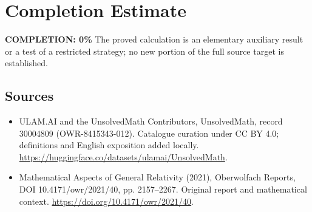 \documentclass[11pt]{article}
\begin{document}
\section{Completion Estimate}
\noindent\textbf{COMPLETION: 0\%}
The proved calculation is an elementary auxiliary result or a test of a restricted strategy; no new portion of the full source target is established.

\subsection{Sources}
\begin{itemize}
\item[\hypertarget{source:30004809:1}{S1}] ULAM.AI and the UnsolvedMath Contributors, UnsolvedMath, record 30004809 (OWR-8415343-012). Catalogue curation under CC BY 4.0; definitions and English exposition added locally.
\url{https://huggingface.co/datasets/ulamai/UnsolvedMath}.
\item[\hypertarget{source:30004809:2}{S2}] Mathematical Aspects of General Relativity (2021), Oberwolfach Reports, DOI 10.4171/owr/2021/40, pp. 2157--2267. Original report and mathematical context.
\url{https://doi.org/10.4171/owr/2021/40}.
\end{itemize}
\label{end:30004809}
\end{document}
